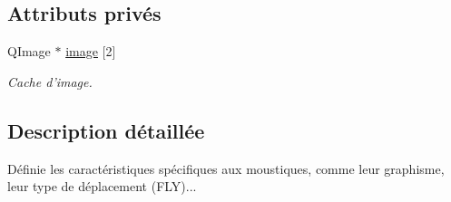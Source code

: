 \subsection*{Attributs privés}
\begin{DoxyCompactItemize}
\item 
QImage $\ast$ \hyperlink{classMosquito_a8c451b0473a7d48ee0ed7de9627f46cb}{image} \mbox{[}2\mbox{]}
\begin{DoxyCompactList}\small\item\em Cache d'image. \end{DoxyCompactList}\end{DoxyCompactItemize}


\subsection{Description détaillée}
Définie les caractéristiques spécifiques aux moustiques, comme leur graphisme, leur type de déplacement (FLY)... 

